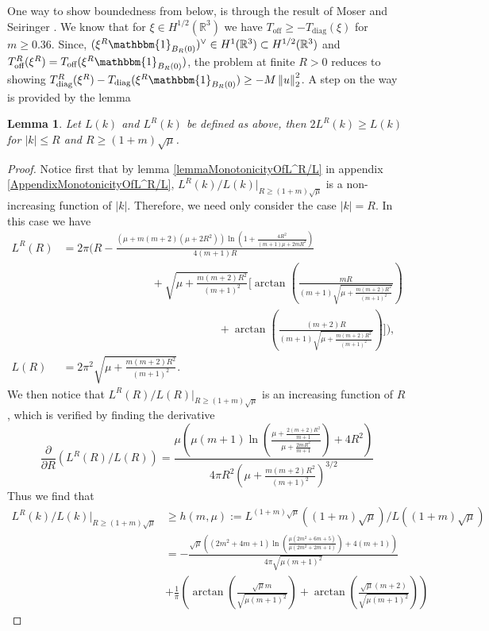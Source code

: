 \documentclass[a4paper,11pt]{article}
\newcommand{\norm}[1]{\left\lVert #1 \right\rVert}
\newcommand{\abs}[1]{\left\lvert #1 \right\rvert}
\newcommand{\R}{\mathbb{R}}
\newtheorem{lemma}{Lemma}
\numberwithin{equation}{section}
\begin{document}
One way to show boundedness from below, is through the result of Moser and Seiringer \cite{Moser_2017}. We know that for $ \xi\in H^{1/2}(\R^3) $ we have $ T_{\text{off}}\geq-T_{\text{diag}}(\xi) $ for $ m\geq0.36 $. Since, $ (\xi^R\mathbbm{1}_{B_R(0)})^\vee\in H^1(\R^3)\subset H^{1/2}(\R^3) $ and $ T^R_{\text{off}}(\xi^R)=T_{\text{off}}(\xi^R\mathbbm{1}_{B_R(0)}) $, the problem at finite $ R>0 $ reduces to showing  $ T^R_{\text{diag}}(\xi^R)-T_{\text{diag}}(\xi^R\mathbbm{1}_{B_R(0)})\geq -M\norm{u}_2^2 $. A step on the way is provided by the lemma \begin{lemma}\label{Lemma2LR>L}
	Let $ L(k) $ and $ L^R(k) $ be defined as above, then $ 2L^R(k)\geq L(k) $ for $ \abs{k}\leq R $ and $ R\geq(1+m)\sqrt{\mu} $.
\end{lemma}
	\begin{proof}
	Notice first that by lemma \ref{lemmaMonotonicityOfL^R/L} in appendix \ref{AppendixMonotonicityOfL^R/L}, $ L^R(k)/L(k)\big\rvert_{R\geq(1+m)\sqrt{\mu}} $ is a non-increasing function of $ \abs{k} $. Therefore, we need only consider the case $ \abs{k}=R $. In this case we have \begin{equation}
	\begin{aligned}
	L^R(R)&=2 \pi  \Bigg( R-\frac{\left(\mu +m (m+2) \left(\mu +2 R^2\right)\right)\ln \left(1+\frac{4 R^2}{(m+1)\mu +2 m R^2}\right)}{4 (m+1) R}\\&\qquad\qquad\qquad\qquad+\sqrt{\mu +\frac{m
			(m+2) R^2}{(m+1)^2}} \Bigg[\arctan\left(\frac{m R}{(m+1) \sqrt{\mu +\frac{m (m+2) R^2}{(m+1)^2}}}\right)\\&\qquad\qquad\qquad\qquad\qquad\qquad\qquad+\arctan \left(\frac{(m+2) R}{(m+1) \sqrt{\mu +\frac{m (m+2)
				R^2}{(m+1)^2}}}\right)\Bigg]\Bigg),\\
	L(R)&=2\pi^2\sqrt{\mu +\frac{m
			(m+2) R^2}{(m+1)^2}}.
	\end{aligned}
	\end{equation}	
	We then notice that $ L^R(R)/L(R)\big\rvert_{R\geq(1+m)\sqrt{\mu}} $ is an increasing function of $ R $, which is verified by finding the derivative\begin{equation}
	\frac{\partial}{\partial R}(L^R(R)/L(R))=\frac{\mu  \left(\mu  (m+1) \ln \left(\frac{\mu +\frac{2 (m+2) R^2}{m+1}}{\mu +\frac{2 m R^2}{m+1}}\right)+4 R^2\right)}{4 \pi  R^2 \left(\mu +\frac{m (m+2) R^2}{(m+1)^2}\right)^{3/2}}
	\end{equation}
	Thus we find that \begin{equation}
	\begin{aligned}
	L^R(k)/L(k)\rvert_{R\geq(1+m)\sqrt{\mu}}&\geq h(m,\mu):= L^{(1+m)\sqrt{\mu}}((1+m)\sqrt{\mu})/L((1+m)\sqrt{\mu})\\
	&=-\frac{\sqrt{\mu } \left(\left(2 m^2+4 m+1\right) \ln \left(\frac{\mu  \left(2 m^2+6 m+5\right)}{\mu  \left(2 m^2+2 m+1\right)}\right)+4 (m+1)\right)}{4 \pi\sqrt{\mu 
				(m+1)^2}}\\&+ \frac{1}{\pi}\left(\arctan\left(\frac{\sqrt{\mu } m}{\sqrt{\mu  (m+1)^2}}\right)+ \arctan\left(\frac{\sqrt{\mu } (m+2)}{\sqrt{\mu  (m+1)^2}}\right)\right)
	\end{aligned}
	\end{equation}
	

\end{proof}
\end{document}

